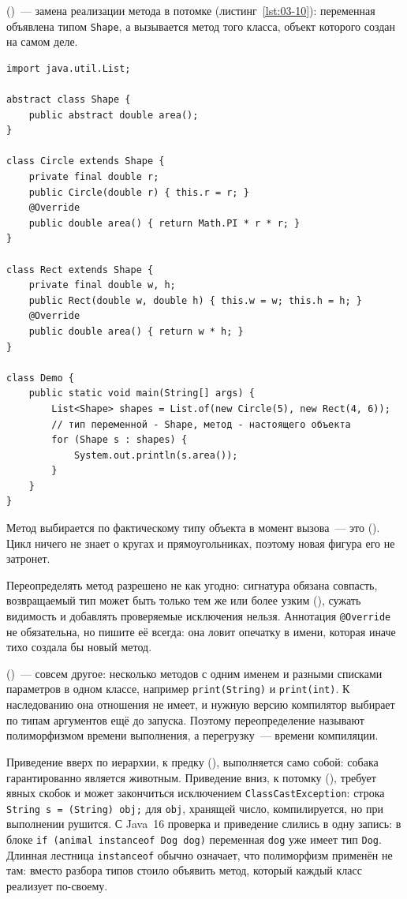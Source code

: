  ()~--- замена реализации метода в
потомке (листинг~\ref{lst:03-10}): переменная объявлена типом \texttt{Shape}, а
вызывается метод того класса, объект которого создан на самом деле.

\begin{listing}[H]
\begin{verbatim}
import java.util.List;

abstract class Shape {
    public abstract double area();
}

class Circle extends Shape {
    private final double r;
    public Circle(double r) { this.r = r; }
    @Override
    public double area() { return Math.PI * r * r; }
}

class Rect extends Shape {
    private final double w, h;
    public Rect(double w, double h) { this.w = w; this.h = h; }
    @Override
    public double area() { return w * h; }
}

class Demo {
    public static void main(String[] args) {
        List<Shape> shapes = List.of(new Circle(5), new Rect(4, 6));
        // тип переменной - Shape, метод - настоящего объекта
        for (Shape s : shapes) {
            System.out.println(s.area());
        }
    }
}
\end{verbatim}
\caption{Полиморфный вызов метода}
\label{lst:03-10}
\end{listing}

Метод выбирается по фактическому типу объекта в момент вызова~--- это
 (). Цикл ничего не знает о кругах и
прямоугольниках, поэтому новая фигура его не затронет.

Переопределять метод разрешено не как угодно: сигнатура обязана совпасть,
возвращаемый тип может быть только тем же или более узким
(), сужать видимость и добавлять проверяемые исключения
нельзя. Аннотация \texttt{@Override} не обязательна, но пишите её всегда: она
ловит опечатку в имени, которая иначе тихо создала бы новый метод.

 ()~--- совсем другое: несколько методов с
одним именем и разными списками параметров в одном классе, например
\texttt{print(String)} и \texttt{print(int)}. К наследованию она отношения не
имеет, и нужную версию компилятор выбирает по типам аргументов ещё до запуска.
Поэтому переопределение называют полиморфизмом времени выполнения, а
перегрузку~--- времени компиляции.

Приведение вверх по иерархии, к предку (), выполняется само
собой: собака гарантированно является животным. Приведение
вниз, к потомку (), требует явных скобок и может закончиться
исключением \texttt{ClassCastException}: строка
\texttt{String s = (String) obj;} для \texttt{obj}, хранящей число,
компилируется, но при выполнении рушится. С Java~16 проверка и приведение
слились в одну запись: в блоке \texttt{if (animal instanceof Dog dog)}
переменная \texttt{dog} уже имеет тип \texttt{Dog}. Длинная лестница
\texttt{instanceof} обычно означает, что полиморфизм применён не там: вместо
разбора типов стоило объявить метод, который каждый класс реализует по-своему.


